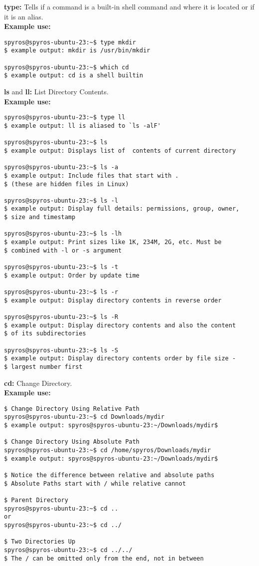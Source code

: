\documentclass{article}
\begin{document}
\textbf{type:} Tells if a command is a built-in shell command and where it is located or if it is an alias.\\\newline
\textbf{Example use:}
\begin{lstlisting}
spyros@spyros-ubuntu-23:~$ type mkdir
$ example output: mkdir is /usr/bin/mkdir

spyros@spyros-ubuntu-23:~$ which cd
$ example output: cd is a shell builtin
\end{lstlisting}
\textbf{ls} and \textbf{ll:} List Directory Contents.\\\newline
\textbf{Example use:}
\begin{lstlisting}
spyros@spyros-ubuntu-23:~$ type ll
$ example output: ll is aliased to `ls -alF'

spyros@spyros-ubuntu-23:~$ ls
$ example output: Displays list of  contents of current directory

spyros@spyros-ubuntu-23:~$ ls -a
$ example output: Include files that start with .
$ (these are hidden files in Linux)

spyros@spyros-ubuntu-23:~$ ls -l
$ example output: Display full details: permissions, group, owner,
$ size and timestamp

spyros@spyros-ubuntu-23:~$ ls -lh
$ example output: Print sizes like 1K, 234M, 2G, etc. Must be
$ combined with -l or -s argument

spyros@spyros-ubuntu-23:~$ ls -t
$ example output: Order by update time

spyros@spyros-ubuntu-23:~$ ls -r
$ example output: Display directory contents in reverse order

spyros@spyros-ubuntu-23:~$ ls -R
$ example output: Display directory contents and also the content
$ of its subdirectories

spyros@spyros-ubuntu-23:~$ ls -S
$ example output: Display directory contents order by file size -
$ largest number first

\end{lstlisting}
\textbf{cd:} Change Directory.\\\newline
\textbf{Example use:}
\begin{lstlisting}
$ Change Directory Using Relative Path
spyros@spyros-ubuntu-23:~$ cd Downloads/mydir
$ example output: spyros@spyros-ubuntu-23:~/Downloads/mydir$

$ Change Directory Using Absolute Path
spyros@spyros-ubuntu-23:~$ cd /home/spyros/Downloads/mydir
$ example output: spyros@spyros-ubuntu-23:~/Downloads/mydir$

$ Notice the difference between relative and absolute paths
$ Absolute Paths start with / while relative cannot

$ Parent Directory
spyros@spyros-ubuntu-23:~$ cd ..
or
spyros@spyros-ubuntu-23:~$ cd ../

$ Two Directories Up
spyros@spyros-ubuntu-23:~$ cd ../../
$ The / can be omitted only from the end, not in between

\end{lstlisting}
\end{document}
